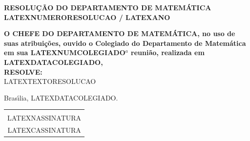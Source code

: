 \documentclass[12pt]{artigo}
\begin{document}
\vspace*{.8cm}
\timbrado
\parindent=2cm 
\setlength{\baselineskip}{5mm}
\noindent

\begin{center}
\vspace{12pt}

\textsc{\bf RESOLU\c{C}\~AO DO DEPARTAMENTO DE MATEM\'ATICA LATEXNUMERORESOLUCAO / LATEXANO}

\end{center}

\vspace{12pt}

\begin{flushright}
\end{flushright}

\vspace{12pt}

\vspace{12pt}

\textbf{O CHEFE DO DEPARTAMENTO DE MATEM\'ATICA, no uso de suas atribui\c{c}\~oes, ouvido o Colegiado do Departamento de Matem\'atica em sua LATEXNUMCOLEGIADO$^a$ reuni\~ao, realizada em LATEXDATACOLEGIADO,}\\

\textbf{RESOLVE:}\\

LATEXTEXTORESOLUCAO

\vspace{12pt}

\begin{flushright}
Bras{\'\i}lia, LATEXDATACOLEGIADO.
\end{flushright}


\vspace*{1.0cm} 
\hspace*{5.5cm}
\setlength{\baselineskip}{4mm}
\begin{center}
\begin{tabular}{c}
\hline \vspace*{-3mm}\\
LATEXNASSINATURA \\
{\small LATEXCASSINATURA}
\end{tabular}
\end{center}
\end{document}
